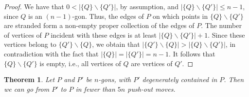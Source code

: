 \documentclass[11pt]{amsart}
\newtheorem{theorem}{Theorem}[section]
\theoremstyle{remark}
\numberwithin{equation}{section}
\renewcommand{\leq}{\leqslant}
\begin{document}
\begin{proof}
We have that $0<|\{Q\}\backslash \{Q'\}|$, by assumption, and $|\{Q\}\backslash \{Q'\}|\leq n-1$, since $Q$ is an $(n-1)$-gon. Thus, the edges of $P$ on which points in 
$\{Q\}\backslash \{Q'\}$ are stranded form a non-empty proper collection of the edges of $P$.  The number of vertices of $P$ incident with these edges  is at least $|\{Q\}\backslash \{Q'\}|+1$. Since these vertices belong to  $\{Q'\}\backslash \{Q\}$, we obtain that $|\{Q'\}\backslash \{Q\}|>|\{Q\}\backslash \{Q'\}|$,   in contradiction 
with the fact that $|\{Q\}|=|\{Q'\}|=n-1$. It follows that  $\{Q\}\backslash \{Q'\}$ is empty, i.e., all vertices of $Q$ are vertices of $Q'$.
\end{proof}


\begin{theorem}\label{in5nmoves}
Let $P$ and $P'$ be $n$-gons, with $P'$ degenerately contained in $P$. Then we can go from $P'$ to $P$ in fewer than $5n$ push-out moves.
\end{theorem}
\end{document}
